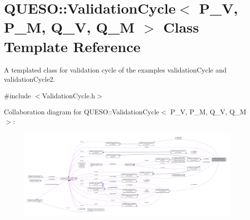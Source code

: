 \hypertarget{class_q_u_e_s_o_1_1_validation_cycle}{\section{Q\-U\-E\-S\-O\-:\-:Validation\-Cycle$<$ P\-\_\-\-V, P\-\_\-\-M, Q\-\_\-\-V, Q\-\_\-\-M $>$ Class Template Reference}
\label{class_q_u_e_s_o_1_1_validation_cycle}
}


A templated class for validation cycle of the examples validation\-Cycle and validation\-Cycle2.  




{\ttfamily \#include $<$Validation\-Cycle.\-h$>$}



Collaboration diagram for Q\-U\-E\-S\-O\-:\-:Validation\-Cycle$<$ P\-\_\-\-V, P\-\_\-\-M, Q\-\_\-\-V, Q\-\_\-\-M $>$\-:
\nopagebreak
\begin{figure}[H]
\begin{center}
\leavevmode
\includegraphics[width=350pt]{class_q_u_e_s_o_1_1_validation_cycle__coll__graph}
\end{center}
\end{figure}

